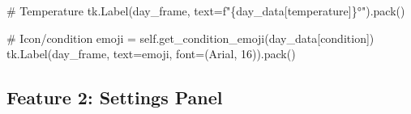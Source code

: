 \documentclass[
  letterpaper,
  DIV=11,
  numbers=noendperiod,
  oneside]{scrreprt}
\newenvironment{Shaded}{}{}
\newcommand{\CommentTok}[1]{\textcolor[rgb]{0.42,0.45,0.49}{#1}}
\newcommand{\DecValTok}[1]{\textcolor[rgb]{0.00,0.36,0.77}{#1}}
\newcommand{\NormalTok}[1]{\textcolor[rgb]{0.14,0.16,0.18}{#1}}
\newcommand{\OperatorTok}[1]{\textcolor[rgb]{0.14,0.16,0.18}{#1}}
\newcommand{\SpecialCharTok}[1]{\textcolor[rgb]{0.00,0.36,0.77}{#1}}
\newcommand{\SpecialStringTok}[1]{\textcolor[rgb]{0.01,0.18,0.38}{#1}}
\newcommand{\StringTok}[1]{\textcolor[rgb]{0.01,0.18,0.38}{#1}}
\newcommand{\VariableTok}[1]{\textcolor[rgb]{0.89,0.38,0.04}{#1}}
\begin{document}
\begin{Shaded}
\begin{Highlighting}[]
            \CommentTok{\# Temperature}
\NormalTok{            tk.Label(day\_frame, text}\OperatorTok{=}\SpecialStringTok{f"}\SpecialCharTok{\{}\NormalTok{day\_data[}\StringTok{\textquotesingle{}temperature\textquotesingle{}}\NormalTok{]}\SpecialCharTok{\}}\SpecialStringTok{°"}\NormalTok{).pack()}
            
            \CommentTok{\# Icon/condition}
\NormalTok{            emoji }\OperatorTok{=} \VariableTok{self}\NormalTok{.get\_condition\_emoji(day\_data[}\StringTok{\textquotesingle{}condition\textquotesingle{}}\NormalTok{])}
\NormalTok{            tk.Label(day\_frame, text}\OperatorTok{=}\NormalTok{emoji, font}\OperatorTok{=}\NormalTok{(}\StringTok{\textquotesingle{}Arial\textquotesingle{}}\NormalTok{, }\DecValTok{16}\NormalTok{)).pack()}
\end{Highlighting}
\end{Shaded}

\subsection{Feature 2: Settings Panel}\label{feature-2-settings-panel}
\end{document}
